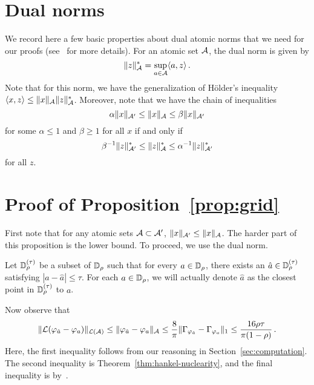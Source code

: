 \section{Dual norms}
We record here a few basic properties about dual atomic norms that we need for our proofs (see~\cite{CRPW10,BhaskarAllerton11} for more details).  For an atomic set $\mathcal{A}$, the dual norm is given by
\[
	\| z \|_{\mathcal{A}}^* = \sup_{a \in \mathcal{A}} \langle a, z \rangle\,.
\] 
Note that for this norm, we have the generalization of H\"{o}lder's inequality $\langle x,z\rangle \leq \|x\|_{\mathcal{A}}\|z\|_{\mathcal{A}}^*$.  Moreover, note that we have the chain of inequalities
\[
	 \alpha \|x\|_{\mathcal{A}'} \leq \|x\|_{\mathcal{A}} \leq \beta\|x\|_{\mathcal{A}'}
\]
for some $\alpha\leq 1$ and $\beta\geq 1$ for all $x$ if and only if
\[
	 \beta^{-1} \|z\|_{\mathcal{A}'}^* \leq \|z\|_{\mathcal{A}}^* \leq \alpha^{-1}\|z\|_{\mathcal{A}'}^*
\]
for all $z$.  

\section{Proof of Proposition~\ref{prop:grid}} First note that for any atomic sets $\mathcal{A} \subset \mathcal{A}'$, $\|x\|_{\mathcal{A}'} \leq \|x\|_{\mathcal{A}}$.  The harder part of this proposition is the lower bound.  To proceed, we use the dual norm. 

Let $\mathbb{D}_\rho^{(\tau)}$ be a subset of $\mathbb{D}_\rho$ such that for every $a \in \mathbb{D}_\rho$, there exists an $\hat{a}\in \mathbb{D}_\rho^{(\tau)}$ satisfying $|a-\hat{a}|\leq \tau$.  For each $a \in \mathbb{D}_\rho$, we will actually denote $\hat{a}$ as the closest point in $\mathbb{D}_\rho^{(\tau)}$ to $a$.

Now observe that 
\begin{align*}
	  \| \mathcal{L}(\varphi_{\hat{a}}-\varphi_a)\|_{\mathcal{L}(\mathcal{A})} \leq  \| \varphi_{\hat{a}}-\varphi_a\|_{\mathcal{A}}
	  \leq \frac{8}{\pi} \|\Gamma_{\varphi_{\hat{a}}}- \Gamma_{\varphi_a}\|_1 \leq \frac{16 \rho \tau}{\pi (1-\rho)}\,.
\end{align*}
Here, the first inequality follows from our reasoning in Section~\ref{sec:computation}.  The second inequality is Theorem~\ref{thm:hankel-nuclearity}, and the final inequality is by~.

